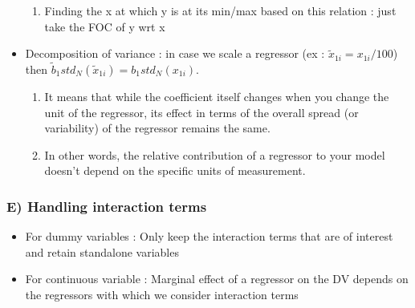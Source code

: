 \documentclass{article}
\begin{document}
\begin{itemize}
\begin{enumerate}
        \item Finding the x at which y is at its min/max based on this relation : just take the FOC of y wrt x
    \end{enumerate}
    \item Decomposition of variance : in case we scale a regressor (ex : $\tilde{x}_{1i} = x_{1i}/100$) then $\tilde{b}_1std_N(\tilde{x}_{1i}) = b_1std_N(x_{1i})$.
    \begin{enumerate}
        \item It means that while the coefficient itself changes when you change the unit of the regressor, its effect in terms of the overall spread (or variability) of the regressor remains the same.
        \item In other words, the relative contribution of a regressor to your model doesn’t depend on the specific units of measurement. 
    \end{enumerate}
\end{itemize}

\subsubsection{E) Handling interaction terms}
\begin{itemize}
    \item For dummy variables : Only keep the interaction terms that are of interest and retain standalone variables
    \item For continuous variable : Marginal effect of a regressor on the DV depends on the regressors with which we consider interaction terms
\end{itemize}
\end{document}
